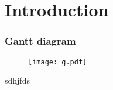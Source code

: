 \documentclass[12pt]{article}
\begin{document}
\section{Introduction}	


\subsubsection{Gantt diagram}
\clearpage
\begin{figure}[htb]
\begin{center} %
\caption[]{}
\end{center}
\end{figure}
\vspace*{\fill}

\begin{figure}[htb]
\ContinuedFloat
\begin{center}
\texttt{[image: g.pdf]}
\end{center}
\caption[]{}
\end{figure}
\clearpage












\clearpage
sdhjfds
\end{document}
